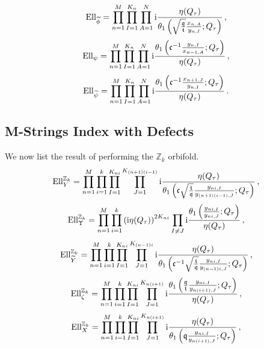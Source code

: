 \documentclass[main.tex]{subfiles}
\begin{document}
\begin{equation}
\textrm{Ell}_{\widetilde{\phi}}=\prod_{n=1}^M\prod_{I=1}^{K_n}\prod_{A=1}^{N}\mathrm{i}\frac{\eta(Q_{\tau})}{\theta_1\left(\sqrt{\frac{\mathfrak{q}}{\mathfrak{t}}}\frac{x_{n,A}}{y_{n,I}};Q_{\tau}\right)}\,,
\end{equation}
\begin{equation}
\textrm{Ell}_{\psi}=\prod_{n=1}^M\prod_{I=1}^{K_n}\prod_{A=1}^{N}\mathrm{i}\frac{\theta_1\left(\mathfrak{c}^{-1}\frac{y_{n,I}}{x_{n-1,A}};Q_{\tau}\right)}{\eta(Q_{\tau})}\,,
\end{equation}
\begin{equation}
\textrm{Ell}_{\widetilde{\psi}}=\prod_{n=1}^M\prod_{I=1}^{K_n}\prod_{A=1}^{N}\mathrm{i}\frac{\theta_1\left(\mathfrak{c}^{-1}\frac{x_{n+1,J}}{y_{n,I}};Q_{\tau}\right)}{\eta(Q_{\tau})}\,.
\end{equation}
\subsection{M-Strings Index with Defects}\label{App:EllZk}
We now list the result of performing the $\mathbb{Z}_k$ orbifold.
\begin{equation}
\textrm{Ell}^{\mathbb{Z}_k}_Y=\prod_{n=1}^M\prod_{i=1}^k\prod_{I=1}^{K_{ni}}\prod_{J=1}^{K_{(n+1)(i-1)}}\mathrm{i}\frac{\eta(Q_{\tau})}{\theta_1\left(\mathfrak{c}\sqrt{\frac{\mathfrak{t}}{\mathfrak{q}}}\frac{y_{ni,I}}{y_{(n+1)(i-1),J}};Q_{\tau}\right)}\,,
\end{equation}
\begin{equation}
\textrm{Ell}^{\mathbb{Z}_k}_{\Upsilon}=\prod_{n=1}^M\prod_{i=1}^k\left(\mathrm{i}\eta(Q_{\tau})\right)^{2K_{ni}}\prod_{I\neq J}\mathrm{i}\frac{\theta_1\left(\frac{y_{ni,I}}{y_{ni,J}};Q_{\tau}\right)}{\eta(Q_{\tau})}\,,
\end{equation}
\begin{equation}
\textrm{Ell}^{\mathbb{Z}_k}_{\widetilde{Y}}=\prod_{n=1}^M\prod_{i=1}^k\prod_{I=1}^{K_{ni}}\prod_{J=1}^{K_{(n-1)i}}\mathrm{i}\frac{\eta(Q_{\tau})}{\theta_1\left(\mathfrak{c}^{-1}\sqrt{\frac{\mathfrak{t}}{\mathfrak{q}}}\frac{y_{ni,I}}{y_{(n-1)i,J}};Q_{\tau}\right)}\,,
\end{equation}
\begin{equation}
\textrm{Ell}^{\mathbb{Z}_k}_{\zeta}=\prod_{n=1}^M\prod_{i=1}^k\prod_{I=1}^{K_{ni}}\prod_{J=1}^{K_{n(i+1)}}\mathrm{i}\frac{\theta_1\left(\frac{\mathfrak{q}}{\mathfrak{t}}\frac{y_{ni,I}}{y_{n(i+1),J}};Q_{\tau}\right)}{\eta(Q_{\tau})}\,,
\end{equation}
\begin{equation}
\textrm{Ell}^{\mathbb{Z}_k}_X=\prod_{n=1}^M\prod_{i=1}^k\prod_{I=1}^{K_{ni}}\prod_{J=1}^{K_{n(i+1)}}\mathrm{i}\frac{\eta(Q_{\tau})}{\theta_1\left(\mathfrak{q}\frac{y_{ni,I}}{y_{n(i+1),J}};Q_{\tau}\right)}\,,
\end{equation}
\end{document}
